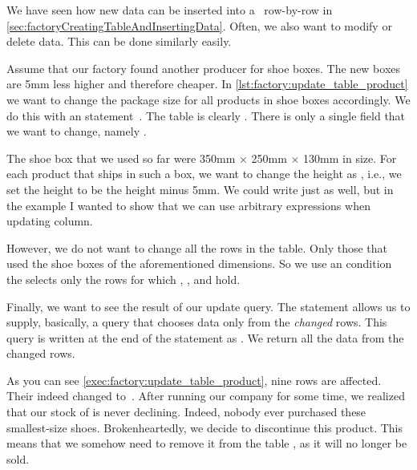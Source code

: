 %
%
%
%
%
%
%
We have seen how new data can be inserted into a \db\ row-by-row in \cref{sec:factoryCreatingTableAndInsertingData}.
Often, we also want to modify or delete data.
This can be done similarly easily.

Assume that our factory found another producer for shoe boxes.
The new boxes are 5mm less higher and therefore cheaper.
In \cref{lst:factory:update_table_product} we want to change the package size for all products in shoe boxes accordingly.
We do this with an  statement~\cite{PGDG:PD:U}.
The table is clearly .
There is only a single field that we want to change, namely .

The shoe box that we used so far were 350mm $\times$ 250mm $\times$ 130mm in size.
For each product that ships in such a box, we want to change the height as , i.e., we set the  height to be the  height minus 5mm.
We could write  just as well, but in the example I wanted to show that we can use arbitrary expressions when updating column.

However, we do not want to change all the rows in the table.
Only those that used the shoe boxes of the aforementioned dimensions.
So we use an  condition the selects only the rows for which , , and  hold.

Finally, we want to see the result of our update query.
The  statement allows us to supply, basically, a  query that chooses data only from the \emph{changed} rows.
This query is written at the end of the statement as .
We return all the data from the changed rows.

As you can see \cref{exec:factory:update_table_product}, nine rows are affected.
Their  indeed changed to~.
\endhsection%
%
%
%
%
After running our company for some time, we realized that our stock of  is never declining.
Indeed, nobody ever purchased these smallest-size shoes.
Brokenheartedly, we decide to discontinue this product.
This means that we somehow need to remove it from the table , as it will no longer be sold.

